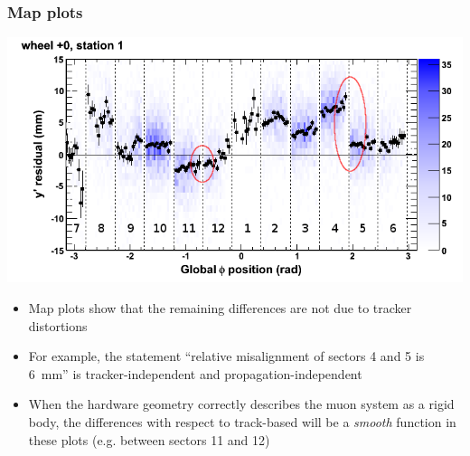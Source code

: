 \documentclass[compress]{beamer}
\begin{document}
\begin{frame}
\frametitle{Map plots}

\begin{center}
\includegraphics[width=0.8\linewidth]{DTvsphi_st1whC_y.png}
\end{center}

\vspace{-0.5 cm}
\begin{itemize}
\item Map plots show that the remaining differences are not due to tracker distortions
\item For example, the statement ``relative misalignment of sectors 4 and 5 is 6~mm'' is tracker-independent and propagation-independent
\item When the hardware geometry correctly describes the muon system as a rigid body, the differences with respect to track-based will be a {\it smooth} function in these plots (e.g. between sectors 11 and 12)
\end{itemize}
\end{frame}
\end{document}
